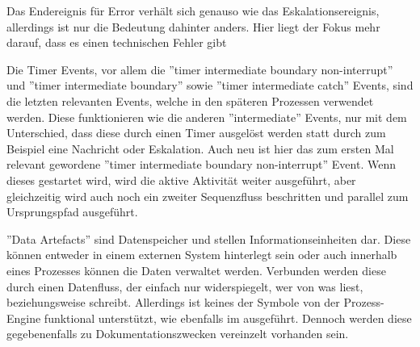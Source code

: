Das Endereignis für Error verhält sich genauso wie das Eskalationsereignis, allerdings ist nur die Bedeutung dahinter anders. Hier liegt der Fokus mehr darauf, dass es einen technischen Fehler gibt \citep[vgl.][S. 104ff]{bruce_englisch_2011}

Die Timer Events, vor allem die ''timer intermediate boundary non-interrupt'' und ''timer intermediate boundary'' sowie ''timer intermediate catch'' Events, sind die letzten relevanten Events, welche in den späteren Prozessen verwendet werden. Diese funktionieren wie die anderen ''intermediate'' Events, nur mit dem Unterschied, dass diese durch einen Timer ausgelöst werden statt durch zum Beispiel eine Nachricht oder Eskalation. Auch neu ist hier das zum ersten Mal relevant gewordene ''timer intermediate boundary non-interrupt'' Event. Wenn dieses gestartet wird, wird die aktive Aktivität weiter ausgeführt, aber gleichzeitig wird auch noch ein zweiter Sequenzfluss beschritten und parallel zum Ursprungspfad ausgeführt. \citep[vgl.][S. 94]{bruce_englisch_2011}

''Data Artefacts'' sind Datenspeicher und stellen Informationseinheiten dar. Diese können entweder in einem externen System hinterlegt sein oder auch innerhalb eines Prozesses können die Daten verwaltet werden. Verbunden werden diese durch einen Datenfluss, der einfach nur widerspiegelt, wer von was liest, beziehungsweise schreibt. Allerdings ist keines der Symbole von der Prozess-Engine funktional unterstützt, wie ebenfalls im  ausgeführt. Dennoch werden diese gegebenenfalls zu Dokumentationszwecken vereinzelt vorhanden sein. \citep[vgl.][S. 59]{bruce_bpmn_2012}




